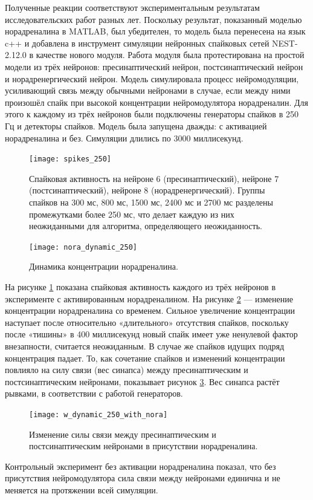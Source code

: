 Полученные реакции соответствуют экспериментальным результатам исследовательских работ разных лет.\cite{viljoen, delaneytransmission, macaca} Поскольку результат, показанный моделью норадреналина в MATLAB, был убедителен, то модель была перенесена на язык c++ и добавлена в инструмент симуляции нейронных спайковых сетей NEST-2.12.0 в качестве нового модуля. Работа модуля была протестирована на простой модели из трёх нейронов: пресинаптический нейрон, постсинаптический нейрон и норадренергический нейрон. Модель симулировала процесс нейромодуляции, усиливающий связь между обычными нейронами в случае, если между ними произошёл спайк при высокой концентрации нейромодулятора норадреналин. Для этого к каждому из трёх нейронов были подключены генераторы спайков в 250 Гц и детекторы спайков. Модель была запущена дважды: с активацией норадреналина и без. Симуляции длились по 3000 миллисекунд.


\begin{figure}
	\centering
	\texttt{[image: spikes\_250]}
	\caption{Спайковая активность на нейроне 6 (пресинаптический), нейроне 7 (постсинаптический), нейроне 8 (норадренергический). Группы спайков на 300 мс, 800 мс, 1500 мс, 2400 мс и 2700 мс разделены промежутками более 250 мс, что делает каждую из них неожиданными для алгоритма, определяющего неожиданность.}
	\label{fig:s_250}
\end{figure}

\begin{figure}
	\centering
	\texttt{[image: nora\_dynamic\_250]}
	\caption{Динамика концентрации норадреналина.}
	\label{fig:nora_dynamic_250}
\end{figure}


На рисунке \ref{fig:s_250} показана спайковая активность каждого из трёх нейронов в эксперименте с активированным норадреналином. На рисунке \ref{fig:nora_dynamic_250} — изменение концентрации норадреналина со временем. Сильное увеличение концентрации наступает после относительно «длительного» отсутствия спайков, поскольку после «тишины» в 400 миллисекунд новый спайк имеет уже ненулевой фактор внезапности, считается неожиданным. В случае же спайков идущих подряд концентрация падает. То, как сочетание спайков и изменений концентрации повлияло на силу связи (вес синапса) между пресинаптическим и постсинаптическим нейронами, показывает рисунок \ref{fig:w_250}. Вес синапса растёт рывками, в соответствии с работой генераторов.

\begin{figure}
	\centering
	\texttt{[image: w\_dynamic\_250\_with\_nora]}
	\caption{Изменение силы связи между пресинаптическим и постсинаптическим нейронами в присутствии норадреналина.}
	\label{fig:w_250}
\end{figure}

Контрольный эксперимент без активации норадреналина показал, что без присутствия нейромодулятора сила связи между нейронами единична и не меняется на протяжении всей симуляции.